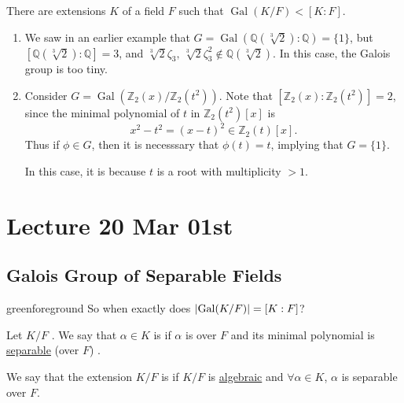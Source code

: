 \documentclass[notoc,notitlepage]{tufte-book}
\DeclareMathOperator{\Gal}{Gal}
\begin{document}
\begin{warning}
  There are extensions $K$ of a field $F$ such that $\Gal(K / F) < [ K : F ]$.
  \begin{enumerate}
    \item We saw in an earlier example that $G = \Gal( \mathbb{Q}(\sqrt[3]{2}) :
      \mathbb{Q} ) = \{ 1 \}$, but $[ \mathbb{Q}(\sqrt[3]{2}) : \mathbb{Q} ] =
      3$, and $\sqrt[3]{2} \zeta_3, \, \sqrt[3]{2} \zeta_3^2 \notin
      \mathbb{Q}(\sqrt[3]{2})$. In this case, the Galois group is too tiny.
    \item Consider $G = \Gal( \mathbb{Z}_2(x) / \mathbb{Z}_2(t^2) )$. Note that
      $[\mathbb{Z}_2(x) : \mathbb{Z}_2(t^2)] = 2$, since the minimal polynomial
      of $t$ in $\mathbb{Z}_2(t^2)[x]$ is
      \begin{equation*}
        x^2 - t^2 = (x - t)^2 \in \mathbb{Z}_2(t)[x].
      \end{equation*}
      Thus if $\phi \in G$, then it is necesssary that $\phi(t) = t$, implying
      that $G = \{ 1 \}$.

      In this case, it is because $t$ is a root with multiplicity $> 1$.
  \end{enumerate}
\end{warning}



\chapter{Lecture 20 Mar 01st}%
\label{chp:lecture_20_mar_01st}

\section{Galois Group of Separable Fields}%
\label{sec:galois_group_of_separable_fields}

\begin{quotebox}{green}{foreground}
  So when exactly does $\abs{ \Gal(K / F) } = [ K : F ]$?
\end{quotebox}

\begin{defn}\label{defn:separable_elements_and_separable_extensions}
  Let $K / F$ . We say that
  $\alpha \in K$ is  if $\alpha$ is  over
  $F$ and its minimal polynomial is
  \hyperref[defn:separable_polynomials]{separable} (over $F$) .

  We say that the extension $K / F$ is  if $K / F$ is
  \hyperref[defn:algebraic_and_transcendental]{algebraic} and $\forall \alpha
  \in K$, $\alpha$ is separable over $F$.
\end{defn}
\end{document}
